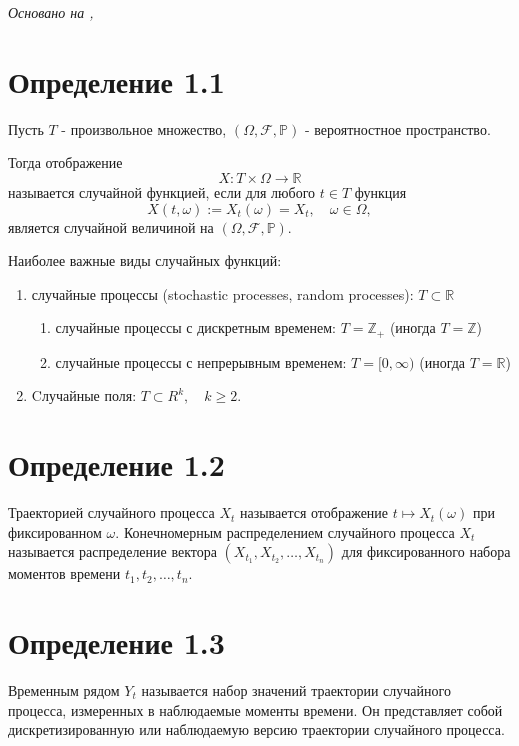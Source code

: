 \textit{Основано на \cite{adeshereKorrelyaciyaMezhduVremennymi2021},
\cite{panovTeoriyaSluchaynyhProcessov2018}}

\section*{Определение 1.1}

Пусть \( T \) - произвольное множество, \( (\Omega, \mathcal{F},
\mathbb{P}) \) - вероятностное пространство.

Тогда отображение \[ X : T \times \Omega \to \mathbb{R} \] называется
случайной функцией, если для
любого \( t \in T \) функция \[ X(t, \omega) := X_t(\omega) = X_t,
\quad \omega \in \Omega, \]  является случайной величиной на \(
(\Omega, \mathcal{F}, \mathbb{P}) \).

Наиболее важные виды случайных функций:
\begin{enumerate}
  \item случайные процессы (stochastic processes, random processes):
    \( T \subset \mathbb{R} \)
    \begin{enumerate}
      \item случайные процессы с дискретным временем: \( T =
        \mathbb{Z}_+ \) (иногда \( T = \mathbb{Z} \))
      \item случайные процессы с непрерывным временем: \( T = [0,
        \infty) \) (иногда \( T = \mathbb{R} \))
    \end{enumerate}
  \item Cлучайные поля: \( T \subset R^k, \quad k \geq 2 \).
\end{enumerate}

\section*{Определение 1.2}
Траекторией случайного процесса \( X_t \)
называется отображение \( t \mapsto X_t(\omega) \) при
фиксированном \( \omega \).
Конечномерным распределением случайного процесса \( X_t \)
называется распределение вектора \( (X_{t_1}, X_{t_2}, \ldots,
X_{t_n}) \) для фиксированного набора моментов
времени \( t_1, t_2, \ldots, t_n \).

\section*{Определение 1.3} Временным рядом \( Y_t \) называется
набор значений траектории случайного процесса,
измеренных в наблюдаемые моменты времени. Он представляет собой
дискретизированную или наблюдаемую версию траектории случайного процесса.

